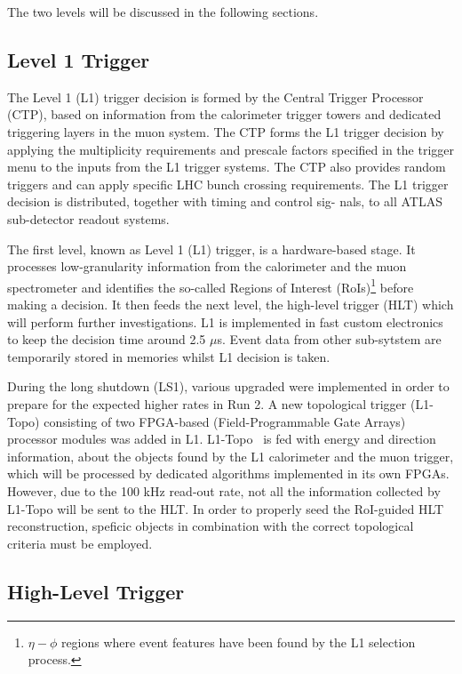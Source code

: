 		The two levels will be discussed in the following sections.


		
		\subsection{Level 1 Trigger}
		\label{sec:L1}

			The Level 1 (L1) trigger decision is formed by the Central Trigger Processor (CTP), based on information from the calorimeter trigger towers and dedicated triggering layers in the muon system. The CTP forms the L1 trigger decision by applying the multiplicity requirements and prescale factors specified in the trigger menu to the inputs from the L1 trigger systems. The CTP also provides random triggers and can apply specific LHC bunch crossing requirements. The L1 trigger decision is distributed, together with timing and control sig- nals, to all ATLAS sub-detector readout systems.

			The first level, known as Level 1 (L1) trigger, is a hardware-based stage. It processes low-granularity information from the calorimeter and the muon spectrometer and identifies the so-called Regions of Interest (RoIs)\footnote{$\eta - \phi$ regions where event features have been found by the L1 selection process.} before making a decision. It then feeds the next level, the high-level trigger (HLT) which will perform further investigations. L1 is implemented in fast custom electronics to keep the decision time around 2.5 $\mu$s. Event data from other sub-sytstem are temporarily stored in memories whilst L1 decision is taken. 			

			During the long shutdown (LS1), various upgraded were implemented in order to prepare for the expected higher rates in Run 2. A new topological trigger (L1-Topo) consisting of two FPGA-based (Field-Programmable Gate Arrays) processor modules was added in L1. L1-Topo~\cite{ATLASL1Topo} is fed with energy and direction information, about the objects found by the L1 calorimeter and the muon trigger, which will be processed by dedicated algorithms implemented in its own FPGAs. However, due to the 100 kHz read-out rate, not all the information collected by L1-Topo will be sent to the HLT. In order to properly seed the RoI-guided HLT reconstruction, speficic objects in combination with the correct topological criteria must be employed.




		\subsection{High-Level Trigger}
		\label{sec:HLT}

